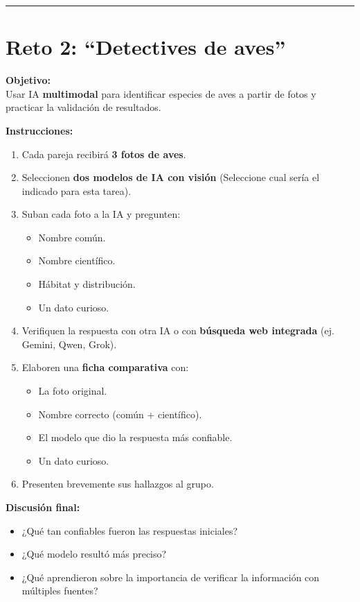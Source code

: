 \documentclass[12pt]{article}
\begin{document}
\vspace{0.5cm}
\hrule
\vspace{0.5cm}

\section*{Reto 2: ``Detectives de aves''}

\textbf{Objetivo:} \\
Usar IA \textbf{multimodal} para identificar especies de aves a partir de fotos y practicar la validación de resultados.

\textbf{Instrucciones:}
\begin{enumerate}[label=\arabic*.]
    \item Cada pareja recibirá \textbf{3 fotos de aves}.
    \item Seleccionen \textbf{dos modelos de IA con visión} (Seleccione cual sería el indicado para esta tarea).
    \item Suban cada foto a la IA y pregunten:
    \begin{itemize}
        \item Nombre común.
        \item Nombre científico.
        \item Hábitat y distribución.
        \item Un dato curioso.
    \end{itemize}
    \item Verifiquen la respuesta con otra IA o con \textbf{búsqueda web integrada} (ej. Gemini, Qwen, Grok).
    \item Elaboren una \textbf{ficha comparativa} con:
    \begin{itemize}
        \item La foto original.
        \item Nombre correcto (común + científico).
        \item El modelo que dio la respuesta más confiable.
        \item Un dato curioso.
    \end{itemize}
    \item Presenten brevemente sus hallazgos al grupo.
\end{enumerate}

\textbf{Discusión final:}
\begin{itemize}
    \item ¿Qué tan confiables fueron las respuestas iniciales?
    \item ¿Qué modelo resultó más preciso?
    \item ¿Qué aprendieron sobre la importancia de verificar la información con múltiples fuentes?
\end{itemize}
\end{document}
